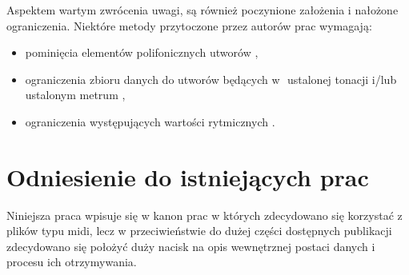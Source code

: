 {{    Aspektem wartym zwrócenia uwagi, są również poczynione założenia i\,\,nałożone
    ograniczenia. Niektóre metody przytoczone przez autorów prac wymagają:
    \begin{itemize}
      \setlength\itemsep{-0.5em}
      \item pominięcia elementów polifonicznych utworów \cite{Hadjeres2016DeepBachAS, Sturm2015FolkMS},
      \item ograniczenia zbioru danych do utworów będących w\,\,
      ustalonej tonacji i/lub ustalonym metrum \cite{Sturm2015FolkMS, Wu2017AHR},
      \item ograniczenia występujących wartości rytmicznych \cite{Hadjeres2016DeepBachAS}.
    \end{itemize}
  }

  \section{Odniesienie do istniejących prac}
  {






    Niniejsza praca wpisuje się w\,\,kanon prac w\,\,których zdecydowano się korzystać z plików typu midi,
    lecz w przeciwieństwie do dużej części dostępnych publikacji zdecydowano się położyć duży nacisk
    na opis wewnętrznej postaci danych i\,\,procesu ich otrzymywania. 
    
}}
